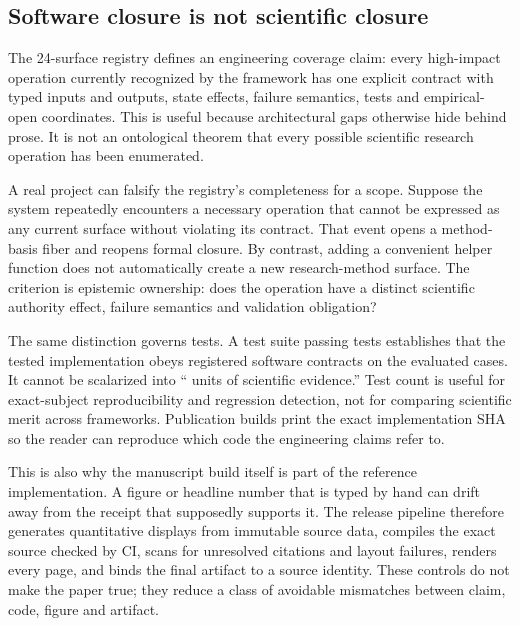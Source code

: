 \subsection{Software closure is not scientific closure}

The 24-surface registry defines an engineering coverage claim: every high-impact operation currently recognized by the framework has one explicit contract with typed inputs and outputs, state effects, failure semantics, tests and empirical-open coordinates. This is useful because architectural gaps otherwise hide behind prose. It is not an ontological theorem that every possible scientific research operation has been enumerated.

A real project can falsify the registry's completeness for a scope. Suppose the system repeatedly encounters a necessary operation that cannot be expressed as any current surface without violating its contract. That event opens a method-basis fiber and reopens formal closure. By contrast, adding a convenient helper function does not automatically create a new research-method surface. The criterion is epistemic ownership: does the operation have a distinct scientific authority effect, failure semantics and validation obligation?

The same distinction governs tests. A test suite passing \SoftwareTests{} tests establishes that the tested implementation obeys registered software contracts on the evaluated cases. It cannot be scalarized into ``\SoftwareTests{} units of scientific evidence.'' Test count is useful for exact-subject reproducibility and regression detection, not for comparing scientific merit across frameworks. Publication builds print the exact implementation SHA so the reader can reproduce which code the engineering claims refer to.

This is also why the manuscript build itself is part of the reference implementation. A figure or headline number that is typed by hand can drift away from the receipt that supposedly supports it. The release pipeline therefore generates quantitative displays from immutable source data, compiles the exact source checked by CI, scans for unresolved citations and layout failures, renders every page, and binds the final artifact to a source identity. These controls do not make the paper true; they reduce a class of avoidable mismatches between claim, code, figure and artifact.
